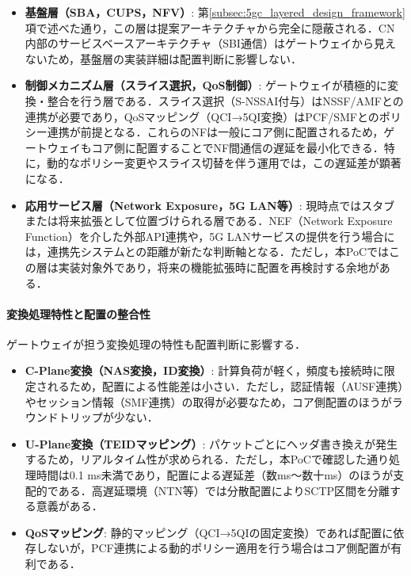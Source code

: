 \begin{itemize}
    \item \textbf{基盤層（SBA，CUPS，NFV）}: 第\ref{subsec:5gc_layered_design_framework}項で述べた通り，この層は提案アーキテクチャから完全に隠蔽される．CN内部のサービスベースアーキテクチャ（SBI通信）はゲートウェイから見えないため，基盤層の実装詳細は配置判断に影響しない．

    \item \textbf{制御メカニズム層（スライス選択，QoS制御）}: ゲートウェイが積極的に変換・整合を行う層である．スライス選択（S-NSSAI付与）はNSSF/AMFとの連携が必要であり，QoSマッピング（QCI→5QI変換）はPCF/SMFとのポリシー連携が前提となる．これらのNFは一般にコア側に配置されるため，ゲートウェイもコア側に配置することでNF間通信の遅延を最小化できる．特に，動的なポリシー変更やスライス切替を伴う運用では，この遅延差が顕著になる．

    \item \textbf{応用サービス層（Network Exposure，5G LAN等）}: 現時点ではスタブまたは将来拡張として位置づけられる層である．NEF（Network Exposure Function）を介した外部API連携や，5G LANサービスの提供を行う場合には，連携先システムとの距離が新たな判断軸となる．ただし，本PoCではこの層は実装対象外であり，将来の機能拡張時に配置を再検討する余地がある．
\end{itemize}

\paragraph{変換処理特性と配置の整合性}
ゲートウェイが担う変換処理の特性も配置判断に影響する．

\begin{itemize}
    \item \textbf{C-Plane変換（NAS変換，ID変換）}: 計算負荷が軽く，頻度も接続時に限定されるため，配置による性能差は小さい．ただし，認証情報（AUSF連携）やセッション情報（SMF連携）の取得が必要なため，コア側配置のほうがラウンドトリップが少ない．

    \item \textbf{U-Plane変換（TEIDマッピング）}: パケットごとにヘッダ書き換えが発生するため，リアルタイム性が求められる．ただし，本PoCで確認した通り処理時間は0.1 ms未満であり，配置による遅延差（数ms〜数十ms）のほうが支配的である．高遅延環境（NTN等）では分散配置によりSCTP区間を分離する意義がある．

    \item \textbf{QoSマッピング}: 静的マッピング（QCI→5QIの固定変換）であれば配置に依存しないが，PCF連携による動的ポリシー適用を行う場合はコア側配置が有利である．
\end{itemize}

